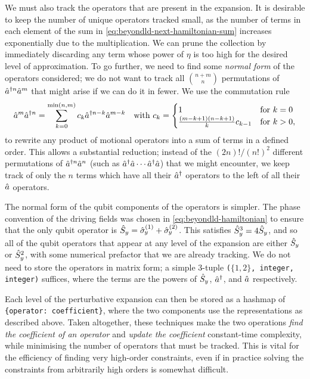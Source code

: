 We must also track the operators that are present in the expansion.
It is desirable to keep the number of unique operators tracked small, as the number of terms in each element of the sum in \cref{eq:beyondld-next-hamiltonian-sum} increases exponentially due to the multiplication.
We can prune the collection by immediately discarding any term whose power of $\eta$ is too high for the desired level of approximation.
To go further, we need to find some \emph{normal form} of the operators considered; we do not want to track all $\binom{n+m}{n}$ permutations of $\hat{a}^{\dagger n}\hat{a}^m$ that might arise if we can do it in fewer.
We use the commutation rule
\begin{equation}
\hat{a}^m\hat{a}^{\dagger n} = \sum_{k=0}^{\min(n,m)} c_k \hat{a}^{\dagger n - k}\hat{a}^{m-k}
\quad\text{with\ }
c_k = \begin{cases}
    1 & \text{for $k = 0$}\\
    \frac{(m-k+1)(n-k+1)}{k}c_{k-1} & \text{for $k>0$},
\end{cases}
\end{equation}
to rewrite any product of motional operators into a sum of terms in a defined order.
This allows a substantial reduction; instead of the $(2n)!/(n!)^2$ different permutations of $\hat{a}^{\dagger n}\hat{a}^n$ (such as $\hat{a}^\dagger\hat{a}\dotsm\hat{a}^\dagger\hat{a}$) that we might encounter, we keep track of only the $n$ terms which have all their $\hat{a}^\dagger$ operators to the left of all their $\hat{a}$ operators.

The normal form of the qubit components of the operators is simpler.
The phase convention of the driving fields was chosen in \cref{eq:beyondld-hamiltonian} to ensure that the only qubit operator is $\hat{S}_y = \hat{\sigma}_{\mkern-1mu y}^{(1)} + \hat{\sigma}_{\mkern-1mu y}^{(2)}$.
This satisfies $\hat{S}_y^3 = 4\hat{S}_y$, and so all of the qubit operators that appear at any level of the expansion are either $\hat{S}_y$ or $\hat{S}_y^2$, with some numerical prefactor that we are already tracking.
We do not need to store the operators in matrix form; a simple 3-tuple \texttt{($\{1,2\}$, integer, integer)} suffices, where the terms are the powers of $\hat{S}_y$, $\hat{a}^\dagger$, and $\hat{a}$ respectively.

Each level of the perturbative expansion can then be stored as a hashmap of \texttt{\{operator: coefficient\}}, where the two components use the representations as described above.
Taken altogether, these techniques make the two operations \emph{find the coefficient of an operator} and \emph{update the coefficient} constant-time complexity, while minimising the number of operators that must be tracked.
This is vital for the efficiency of finding very high-order constraints, even if in practice solving the constraints from arbitrarily high orders is somewhat difficult.

